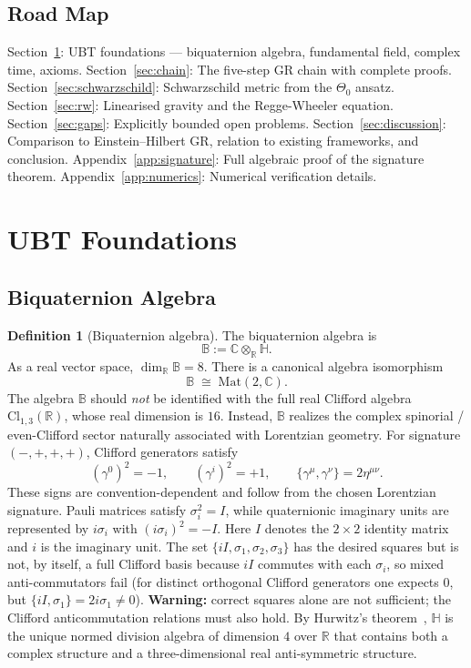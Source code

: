 \documentclass[12pt,a4paper]{article}
\theoremstyle{definition}
\newtheorem{definition}[theorem]{Definition}
\theoremstyle{remark}
\newcommand{\BB}{\mathbb{B}}
\newcommand{\CC}{\mathbb{C}}
\newcommand{\RR}{\mathbb{R}}
\newcommand{\HH}{\mathbb{H}}
\begin{document}
\subsection{Road Map}

Section~\ref{sec:foundations}: UBT foundations — biquaternion algebra,
fundamental field, complex time, axioms.
Section~\ref{sec:chain}: The five-step GR chain with complete proofs.
Section~\ref{sec:schwarzschild}: Schwarzschild metric from the $\Theta_0$ ansatz.
Section~\ref{sec:rw}: Linearised gravity and the Regge-Wheeler equation.
Section~\ref{sec:gaps}: Explicitly bounded open problems.
Section~\ref{sec:discussion}: Comparison to Einstein--Hilbert GR, relation
to existing frameworks, and conclusion.
Appendix~\ref{app:signature}: Full algebraic proof of the signature theorem.
Appendix~\ref{app:numerics}: Numerical verification details.

\section{UBT Foundations}
\label{sec:foundations}

\subsection{Biquaternion Algebra}

\begin{definition}[Biquaternion algebra]
\label{def:biquaternion}
The biquaternion algebra is
\[
  \BB := \CC\otimes_\RR\HH.
\]
As a real vector space, $\dim_\RR\BB = 8$.
There is a canonical algebra isomorphism
\[
  \BB \;\cong\; \mathrm{Mat}(2,\CC).
\]
The algebra $\BB$ should \emph{not} be identified with the full real Clifford
algebra $\mathrm{Cl}_{1,3}(\RR)$, whose real dimension is $16$.
Instead, $\BB$ realizes the complex spinorial / even-Clifford sector naturally
associated with Lorentzian geometry.
For signature $(-,+,+,+)$, Clifford generators satisfy
\[
  (\gamma^0)^2 = -1, \qquad
  (\gamma^i)^2 = +1, \qquad
  \{\gamma^\mu, \gamma^\nu\} = 2\eta^{\mu\nu}.
\]
These signs are convention-dependent and follow from the chosen Lorentzian
signature.
Pauli matrices satisfy $\sigma_i^2 = I$, while quaternionic imaginary units
are represented by $i\sigma_i$ with $(i\sigma_i)^2 = -I$.
Here $I$ denotes the $2\times2$ identity matrix and $i$ is the imaginary unit.
The set $\{iI,\sigma_1,\sigma_2,\sigma_3\}$ has the desired squares but is
not, by itself, a full Clifford basis because $iI$ commutes with each
$\sigma_i$, so mixed anti-commutators fail (for distinct orthogonal Clifford
generators one expects $0$, but $\{iI,\sigma_1\}=2i\sigma_1\neq0$).
\textbf{Warning:} correct squares alone are not sufficient; the Clifford
anticommutation relations must also hold.
By Hurwitz's theorem~\cite{hurwitz1923}, $\HH$ is the unique normed division
algebra of dimension $4$ over $\RR$ that contains both a complex structure
and a three-dimensional real anti-symmetric structure.
\end{definition}
\end{document}
